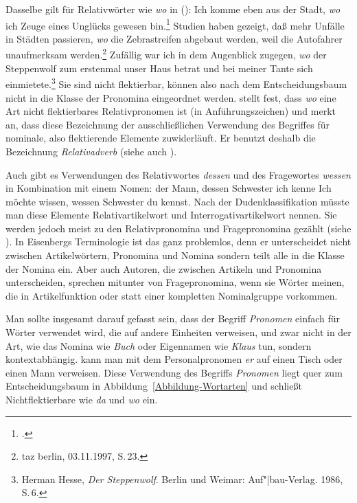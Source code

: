 \documentclass[ number=45
			   ,series=eotms
			   ,printondemand
			  ]{langsci}
\newcommand{\page}{S.\,}
\let\citew=\citealp
\begin{document}
{Dasselbe gilt für Relativwörter wie \emph{wo} in ():
\eal
\ex Ich komme eben aus der Stadt, \emph{wo} ich Zeuge eines Unglücks gewesen bin.\footnote{
 	\citew*[\page 672]{Duden84}.
 	}\label{bsp-wo-ich-zeuge}
\ex Studien haben gezeigt, daß mehr Unfälle in Städten passieren, \emph{wo}
      die Zebrastreifen abgebaut werden, weil die Autofahrer unaufmerksam werden.\footnote{
        taz berlin, 03.11.1997, S.\,23.
        }
\ex Zufällig war ich in dem Augenblick zugegen, \emph{wo} der Steppenwolf 
      zum erstenmal unser Haus betrat und bei meiner Tante sich einmietete.\footnote{
                Herman Hesse, \emph{Der Steppenwolf}. Berlin und Weimar: Auf"|bau-Verlag. 1986, S.\,6.
	}
\zl
Sie sind nicht flektierbar, können also nach dem Entscheidungsbaum nicht in die Klasse der Pronomina
eingeordnet werden. \citet[\page 233]{Eisenberg2004a} stellt fest, dass \emph{wo} eine Art nicht flektierbares
Relativpronomen ist (in Anführungszeichen) und merkt an, dass diese Bezeichnung der ausschließlichen
Verwendung des Begriffes für nominale, also flektierende Elemente zuwiderläuft. Er benutzt deshalb
die Bezeichnung \emph{Relativadverb} (siehe auch \citew[\S 856, \S 857]{Duden2005}).

%
Auch gibt es Verwendungen des Relativwortes \emph{dessen} und des Fragewortes \emph{wessen} in
Kombination mit einem Nomen:
\eal
\ex der Mann, dessen Schwester ich kenne
\ex Ich möchte wissen, wessen Schwester du kennst.
\zl
Nach der Dudenklassifikation müsste man diese Elemente Relativartikelwort und
Interrogativartikelwort nennen.
Sie werden jedoch meist zu den Relativpronomina und Fragepronomina
gezählt (siehe \zb \citew[\page 229]{Eisenberg2004a}).
In Eisenbergs Terminologie ist das ganz problemlos, denn er unterscheidet nicht zwischen
Artikelwörtern, Pronomina und Nomina sondern teilt alle in die Klasse der Nomina ein. Aber auch
Autoren, die zwischen Artikeln und Pronomina unterscheiden, sprechen mitunter von Fragepronomina,
wenn sie Wörter meinen, die in Artikelfunktion oder statt einer kompletten Nominalgruppe vorkommen.

Man sollte insgesamt darauf gefasst sein, dass der Begriff \emph{Pronomen} einfach für Wörter
verwendet wird, die auf andere Einheiten verweisen, und zwar nicht in der Art, wie das Nomina wie
\emph{Buch} oder Eigennamen wie \emph{Klaus} tun, sondern kontextabhängig. \Zb kann man mit dem Personalpronomen \emph{er}
auf einen Tisch oder einen Mann verweisen. Diese Verwendung des Begriffs \emph{Pronomen} liegt quer
zum Entscheidungsbaum in Abbildung~\ref{Abbildung-Wortarten} und schließt Nichtflektierbare wie
\emph{da} und \emph{wo} ein. 
%

}
\end{document}
